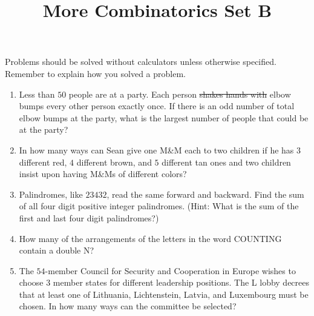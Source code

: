 \documentclass{article}
\title{More Combinatorics Set B}
\author{}
\date{}
\begin{document}
\maketitle
\noindent Problems should be solved without calculators unless otherwise 
specified. Remember to explain how you solved a problem.
\begin{enumerate}
    \item Less than $50$ people are at a party. Each person \sout{shakes hands 
        with} elbow bumps every other person exactly once. If there is an odd 
        number of total elbow bumps at the party, what is the largest number of 
        people that could be at the party?
        \vspace{3cm}
    \item In how many ways can Sean give one M\&M each to two children if he has 
        $3$ different red, $4$ different brown, and $5$ different tan ones and 
        two children insist upon having M\&Ms of different colors?
        \vspace{3cm}
    \item Palindromes, like $23432$, read the same forward and backward. Find 
        the sum of all four digit positive integer palindromes. (Hint: What is 
        the sum of the first and last four digit palindromes?)
        \vspace{3cm}
    \item How many of the arrangements of the letters in the word COUNTING 
        contain a double N?
        \vspace{3cm}
    \item The $54$-member Council for Security and Cooperation in Europe wishes 
        to choose $3$ member states for different leadership positions. The L 
        lobby decrees that at least one of Lithuania, Lichtenstein, Latvia, and 
        Luxembourg must be chosen. In how many ways can the committee be 
        selected?
        \vspace{3cm}
\end{enumerate}
\end{document}
